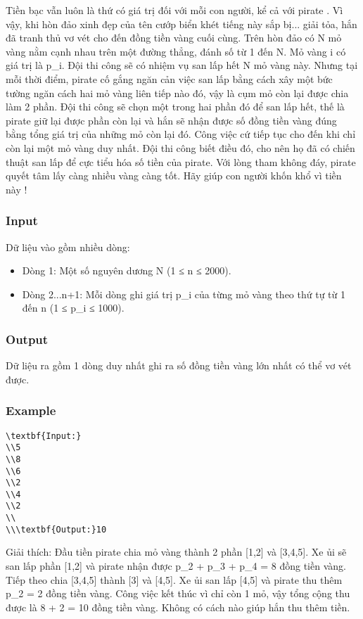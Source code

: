 



   Tiền bạc vẫn luôn là thứ có giá trị đối với mỗi con người, kể cả với   pirate   . Vì vậy, khi hòn đảo xinh đẹp của tên cướp biển khét tiếng này sắp bị... giải tỏa, hắn đã tranh thủ vơ vét cho đến đồng tiền vàng cuối cùng. Trên hòn đảo có N mỏ vàng nằm cạnh nhau trên một đường thẳng, đánh số từ 1 đến N. Mỏ vàng i có giá trị là p\_i. Đội thi công sẽ có nhiệm vụ san lấp hết N mỏ vàng này. Nhưng tại mỗi thời điểm,   pirate   cố gắng ngăn cản việc san lấp bằng cách xây một bức tường ngăn cách hai mỏ vàng liên tiếp nào đó, vậy là cụm mỏ còn lại được chia làm 2 phần. Đội thi công sẽ chọn một trong hai phần đó để san lấp hết, thế là   pirate   giữ lại được phần còn lại và hắn sẽ nhận được số đồng tiền vàng đúng bằng tổng giá trị của những mỏ còn lại đó. Công việc cứ tiếp tục cho đến khi chỉ còn lại một mỏ vàng duy nhất. Đội thi công biết điều đó, cho nên họ đã có chiến thuật san lấp để cực tiểu hóa số tiền của pirate. Với lòng tham không đáy, pirate quyết tâm lấy càng nhiều vàng càng tốt. Hãy giúp con người khốn khổ vì tiền này !  

\subsubsection{   Input  }

   Dữ liệu vào gồm nhiều dòng:  
\begin{itemize}
	\item     Dòng 1: Một số nguyên dương N (1 ≤ n ≤ 2000).   
	\item     Dòng 2...n+1: Mỗi dòng ghi giá trị p\_i của từng mỏ vàng theo thứ tự từ 1 đến n (1 ≤ p\_i ≤ 1000).   
\end{itemize}

\subsubsection{   Output  }

   Dữ liệu ra gồm 1 dòng duy nhất ghi ra số đồng tiền vàng lớn nhất có thể vơ vét được.  

\subsubsection{   Example  }
\begin{verbatim}
\textbf{Input:}
\\5
\\8
\\6
\\2
\\4
\\2
\\
\\\textbf{Output:}10
\end{verbatim}

   Giải thích: Đầu tiền pirate chia mỏ vàng thành 2 phần [1,2] và [3,4,5]. Xe ủi sẽ san lấp phần [1,2] và pirate nhận được p\_2 + p\_3 + p\_4 =  8 đồng tiền vàng. Tiếp theo chia [3,4,5] thành [3] và [4,5]. Xe ủi san lấp [4,5] và pirate thu thêm p\_2 = 2 đồng tiền vàng. Công việc kết thúc vì chỉ còn 1 mỏ, vậy tổng cộng thu được là 8 + 2 = 10 đồng tiền vàng. Không có cách nào giúp hắn thu thêm tiền.  
